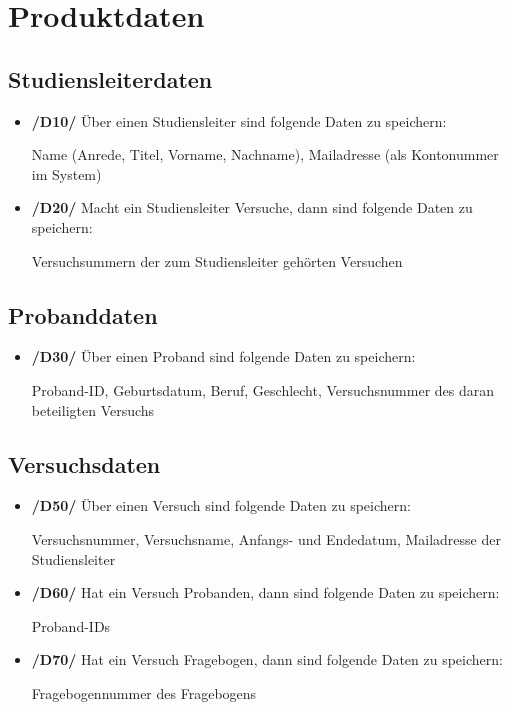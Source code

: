 \documentclass[a4paper]{scrreprt}
\begin{document}
    \chapter{Produktdaten}
        \section{\gls{Studiensleiter}daten}
            \begin{itemize}
                \item \textbf{/D10/} Über einen \gls{Studiensleiter} sind folgende Daten zu speichern:
                    \par Name (Anrede, Titel, Vorname, Nachname), Mailadresse (als Kontonummer im System)

                \item \textbf{/D20/} Macht ein \gls{Studiensleiter} Versuche, dann sind folgende Daten zu speichern:
                    \par Versuchsummern der zum \gls{Studiensleiter} gehörten Versuchen
            \end{itemize}

        \section{\gls{Proband}daten}
            \begin{itemize}
                \item \textbf{/D30/} Über einen \gls{Proband} sind folgende Daten zu speichern:
                    \par \gls{Proband}-ID, Geburtsdatum, Beruf, Geschlecht, Versuchsnummer des daran beteiligten Versuchs
            \end{itemize}

        \section{Versuchsdaten}
            \begin{itemize}
                \item \textbf{/D50/} Über einen Versuch sind folgende Daten zu speichern:
                    \par Versuchsnummer, Versuchsname, Anfangs- und Endedatum, Mailadresse der \gls{Studiensleiter}

                \item \textbf{/D60/} Hat ein Versuch \gls{Proband}en, dann sind folgende Daten zu speichern:
                    \par \gls{Proband}-IDs

                \item \textbf{/D70/} Hat ein Versuch Fragebogen, dann sind folgende Daten zu speichern:
                    \par Fragebogennummer des Fragebogens
            \end{itemize}
\end{document}
